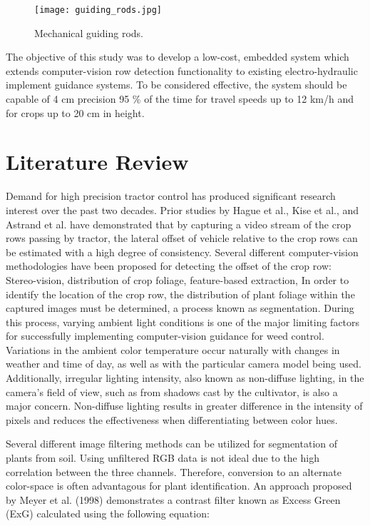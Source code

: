 \begin{figure}
  \centering
  \texttt{[image: guiding\_rods.jpg]}
  \caption{Mechanical guiding rods.}
  \label{fig:guiding_rods}
\end{figure}

The objective of this study was to develop a low-cost, embedded system
which extends computer-vision row detection functionality to existing
electro-hydraulic implement guidance systems.  To be considered
effective, the system should be capable of 4 cm precision 95 \% of the 
time for travel speeds up to 12 km/h and for crops up to 20 cm in
height.

\section{Literature Review}
Demand for high precision tractor control has produced significant
research interest over the past two decades. Prior studies by Hague et
al., Kise et al., and Astrand et al. have demonstrated that by 
capturing a video stream of the crop rows passing by tractor, the 
lateral offset of vehicle relative to the crop rows can be estimated
with a high degree of consistency. Several different computer-vision
methodologies have been proposed for detecting the offset of the crop
row: Stereo-vision, distribution of crop foliage, feature-based extraction, 
In order to identify the location of the crop row, the distribution of
plant foliage within the captured images must be determined, a process
known as segmentation. During this process, varying ambient light
conditions is one of the major limiting factors for successfully
implementing computer-vision guidance for weed control. Variations in
the ambient color temperature occur naturally with changes in weather
and time of day, as well as with the particular camera model being
used. Additionally, irregular lighting intensity, also known as
non-diffuse lighting, in the camera’s field of view, such as from
shadows cast by the cultivator, is also a major concern. Non-diffuse
lighting results in greater difference in the intensity of pixels and
reduces the effectiveness when differentiating between color hues.
 
Several different image filtering methods can be utilized for
segmentation of plants from soil. Using unfiltered RGB data is not
ideal due to the high correlation between the three
channels. Therefore, conversion to an alternate color-space is often
advantagous for plant identification. An approach proposed by Meyer et
al. (1998) demonstrates a contrast filter known as Excess Green (ExG)
calculated using the following equation:

